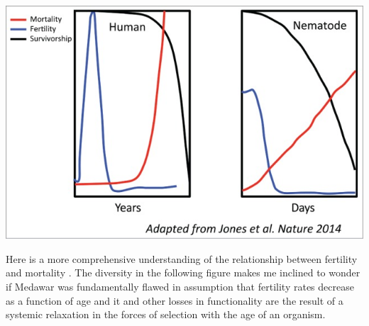 \documentclass[]{book}
\newenvironment{Shaded}{\begin{snugshade}}{\end{snugshade}}
\newcommand{\KeywordTok}[1]{\textcolor[rgb]{0.13,0.29,0.53}{\textbf{#1}}}
\newcommand{\DataTypeTok}[1]{\textcolor[rgb]{0.13,0.29,0.53}{#1}}
\newcommand{\DecValTok}[1]{\textcolor[rgb]{0.00,0.00,0.81}{#1}}
\newcommand{\StringTok}[1]{\textcolor[rgb]{0.31,0.60,0.02}{#1}}
\newcommand{\OtherTok}[1]{\textcolor[rgb]{0.56,0.35,0.01}{#1}}
\newcommand{\OperatorTok}[1]{\textcolor[rgb]{0.81,0.36,0.00}{\textbf{#1}}}
\newcommand{\NormalTok}[1]{#1}
\begin{document}
\includegraphics{images/04-6.jpg}

Here is a more comprehensive understanding of the relationship between
fertility and mortality \citep{jones2014diversity}. The diversity in the
following figure makes me inclined to wonder if Medawar was
fundamentally flawed in assumption that fertility rates decrease as a
function of age and it and other losses in functionality are the result
of a systemic relaxation in the forces of selection with the age of an
organism.

\begin{Shaded}
\end{Shaded}
\end{document}
